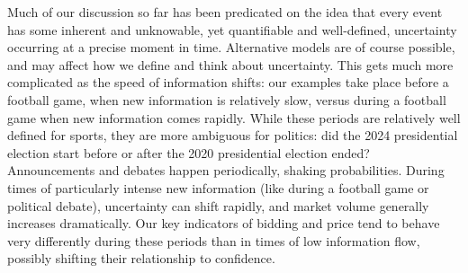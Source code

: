 \documentclass[sigconf,anonymous]{aamas}   %
\newcommand{\rupert}[1]{\ifnum\Chatty=1 \textcolor{red}   {Rupert: [#1]} \fi}
\begin{document}
Much of our discussion so far has been predicated on the idea that every event has some inherent and unknowable, yet quantifiable and well-defined, uncertainty occurring at a precise moment in time. Alternative models are of course possible, and may affect how we define and think about uncertainty. This gets much more complicated as the speed of information shifts: our examples take place before a football game, when new information is relatively slow, versus during a football game when new information comes rapidly. While these periods are relatively well defined for sports, they are more ambiguous for politics: did the 2024 presidential election start before or after the 2020 presidential election ended? Announcements and debates happen periodically, shaking probabilities. 
During times of particularly intense new information (like during a football game or political debate), uncertainty can shift rapidly, and market volume generally increases dramatically. Our key indicators of bidding and price tend to behave very differently during these periods than in times of low information flow, possibly shifting their relationship to confidence.


%
\end{document}
